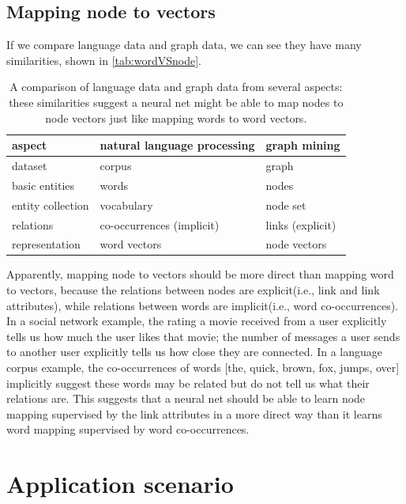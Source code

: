 \documentclass{article}
\begin{document}
\subsection{Mapping node to vectors}
If we compare language data and graph data, we can see they have many 
similarities, shown in \autoref{tab:wordVSnode}.
\begin{table}[h]
	\centering
	\begin{tabularx}{\textwidth}{ |X|X|X| } \hline
		aspect  & natural language processing & graph mining \\ \hline
		dataset & corpus & graph \\ \hline
		basic entities & words & nodes \\ \hline
		entity collection & vocabulary & node set \\ \hline
		relations & co-occurrences (implicit) & links (explicit) \\ \hline
		representation & word vectors & node vectors \\ \hline
	\end{tabularx}
	\caption{A comparison of language data and graph data from 
		several aspects: these similarities suggest a neural net might be able 
		to map nodes to node vectors just like mapping words to word vectors.}
	\label{tab:wordVSnode}
\end{table}
Apparently, mapping node to vectors should be more direct than mapping word to 
vectors, because the relations between nodes are explicit(i.e., link and link 
attributes), while relations between words are implicit(i.e., word 
co-occurrences).
In a social network example, the rating a movie received from a user explicitly 
tells us how much the user likes that movie; the number of messages a user 
sends to another user explicitly tells us how close they are connected.
In a language corpus example, the co-occurrences of words [the, quick, brown, 
fox, jumps, over] implicitly suggest these words may be related but do not tell 
us what their relations are.
This suggests that a neural net should be able to learn node mapping supervised 
by the link attributes in a more direct way than it learns word mapping 
supervised by word co-occurrences.

\section{Application scenario}
\end{document}
